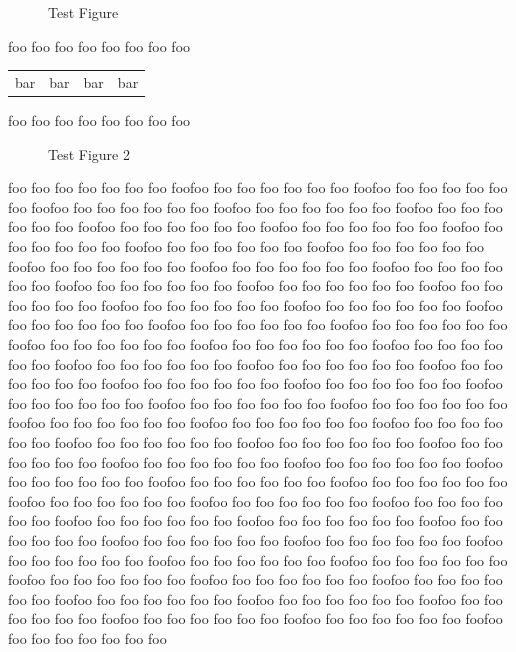 \documentclass[a4paper,12pt]{article}
\newcommand{\baz}{foo foo foo foo foo foo foo foo}
\newcommand{\qux}{\baz\baz\baz\baz\baz\baz\baz\baz}
\begin{document}
\begin{figure}
\caption{Test Figure}
\vspace{10cm}
\end{figure}

\baz

\begin{longtable}{llll}
bar & bar & bar & bar
\end{longtable}

\baz


\begin{figure}
\caption{Test Figure 2}
\vspace{10cm}
\end{figure}

\qux\qux\qux\qux\qux\qux\qux\qux
\end{document}
